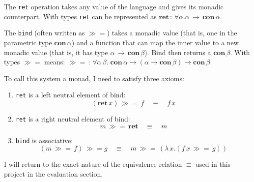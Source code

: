\documentclass[12pt,twoside,notitlepage]{report}
\theoremstyle{plain}%
\theoremstyle{definition}
\theoremstyle{remark}
\begin{document}
The \lstinline|ret| operation takes any value of the language and gives its monadic counterpart. With types \lstinline|ret| can be represented as $ \textbf{ret} \, :\, \forall \alpha. \alpha\, \rightarrow\, \textbf{con}\, \alpha $.

The \lstinline|bind| (often written as $ \gg= $)  takes a monadic value (that is, one in the parametric type $ \textbf{con} \, \alpha $) and a function that can map the inner value to a new monadic value (that is, it has type $ \alpha \, \rightarrow \, \textbf{con} \, \beta $). Bind then returns a $ \textbf{con} \, \beta $. With types $ \gg= $ means: $ \gg= \, : \, \forall \alpha \, \beta. \; \textbf{con} \, \alpha \rightarrow (\alpha \rightarrow \textbf{con} \, \beta) \rightarrow \textbf{con} \, \beta $.

To call this system a monad, I need to satisfy three axioms:

\begin{enumerate}
\item{\lstinline|ret| is a left neutral element of bind:
\[ (\textbf{ret} \, x) \, \gg=\, f \quad \equiv \quad f \, x \]}
\item{\lstinline|ret| is a right neutral element of bind:
\[ m \, \gg=\, \textbf{ret} \quad \equiv \quad m \]}
\item{\lstinline|bind| is associative:
\[ (m \, \gg= \, f) \, \gg= g \quad \equiv \quad m\, \gg= \, (\lambda\, x. (f\, x \, \gg= \, g) ) \]}
\end{enumerate}

I will return to the exact nature of the equivalence relation $ \equiv $ used in this project in the evaluation section. \label{sec:first_mention_of_equiv}
\end{document}
